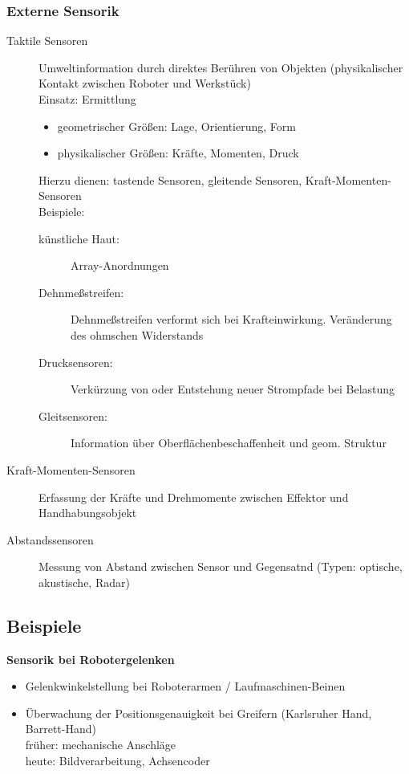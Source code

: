 \subsubsection{Externe Sensorik}

\begin{description}
\item[Taktile Sensoren] Umweltinformation durch direktes Berühren von Objekten (physikalischer Kontakt zwischen Roboter und Werkstück) \\ Einsatz: Ermittlung
\begin{itemize}
\item geometrischer Größen: Lage, Orientierung, Form
\item physikalischer Größen: Kräfte, Momenten, Druck
\end{itemize}
Hierzu dienen: tastende Sensoren, gleitende Sensoren, Kraft-Momenten-Sensoren \\ Beispiele:
\begin{description}
\item[künstliche Haut:] Array-Anordnungen
\item[Dehnmeßstreifen:] Dehnmeßstreifen verformt sich bei Krafteinwirkung. Veränderung des ohmschen Widerstands
\item[Drucksensoren:] Verkürzung von oder Entstehung neuer Strompfade bei Belastung
\item[Gleitsensoren:] Information über Oberflächenbeschaffenheit und geom. Struktur
\end{description}
\item[Kraft-Momenten-Sensoren] Erfassung der Kräfte und Drehmomente zwischen Effektor und Handhabungsobjekt
\item[Abstandssensoren] Messung von Abstand zwischen Sensor und Gegensatnd (Typen: optische, akustische, Radar)
\end{description}

\subsection{Beispiele}

\textbf{Sensorik bei Robotergelenken}
\begin{itemize}
\item Gelenkwinkelstellung bei Roboterarmen / Laufmaschinen-Beinen
\item Überwachung der Positionsgenauigkeit bei Greifern (Karlsruher Hand, Barrett-Hand) \\
früher: mechanische Anschläge \\ heute: Bildverarbeitung, Achsencoder
\end{itemize}

